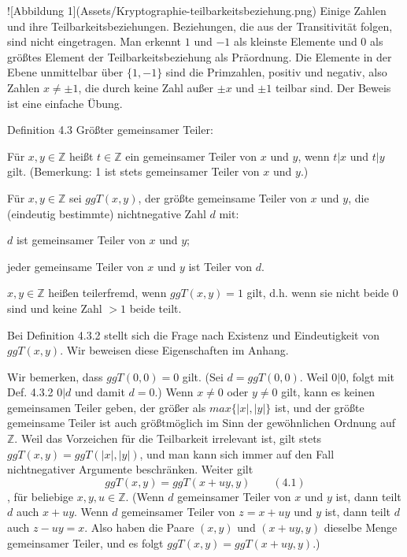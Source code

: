 \documentclass[a4paper]{article}
\begin{document}
\begin{multicols}{3}
    ![Abbildung 1](Assets/Kryptographie-teilbarkeitsbeziehung.png)
    Einige Zahlen und ihre Teilbarkeitsbeziehungen. Beziehungen, die aus der Transitivität folgen, sind nicht eingetragen. Man erkennt $1$ und $-1$ als kleinste Elemente und $0$ als größtes Element der Teilbarkeitsbeziehung als Präordnung. Die Elemente in der Ebene unmittelbar über $\{1,-1\}$ sind die Primzahlen, positiv und negativ, also Zahlen $x\not=\pm 1$, die durch keine Zahl außer $\pm x$ und $\pm 1$ teilbar sind.
    Der Beweis ist eine einfache Übung.

    Definition 4.3 Größter gemeinsamer Teiler:
    \begin{enumerate*}
        \item Für $x,y\in\mathbb{Z}$ heißt $t\in\mathbb{Z}$ ein gemeinsamer Teiler von $x$ und $y$, wenn $t|x$ und $t|y$ gilt. (Bemerkung: 1 ist stets gemeinsamer Teiler von $x$ und $y$.)
        \item Für $x,y\in\mathbb{Z}$ sei $ggT(x, y)$, der größte gemeinsame Teiler von $x$ und $y$, die (eindeutig bestimmte) nichtnegative Zahl $d$ mit:
        \begin{itemize*}
            \item $d$ ist gemeinsamer Teiler von $x$ und $y$;
            \item jeder gemeinsame Teiler von $x$ und $y$ ist Teiler von $d$.
        \end{itemize*}
        \item $x,y\in\mathbb{Z}$ heißen teilerfremd, wenn $ggT(x,y)=1$ gilt, d.h. wenn sie nicht beide $0$ sind und keine Zahl $>1$ beide teilt.
    \end{enumerate*}

    Bei Definition 4.3.2 stellt sich die Frage nach Existenz und Eindeutigkeit von $ggT(x,y)$. Wir beweisen diese Eigenschaften im Anhang.

    Wir bemerken, dass $ggT(0,0) = 0$ gilt. (Sei $d = ggT(0,0)$. Weil $0|0$, folgt mit Def. 4.3.2 $0|d$ und damit $d=0$.) Wenn $x\not= 0$ oder $y\not= 0$ gilt, kann es keinen gemeinsamen Teiler geben, der größer als $max\{|x|,|y|\}$ ist, und der größte gemeinsame Teiler ist auch größtmöglich im Sinn der gewöhnlichen Ordnung auf $\mathbb{Z}$. Weil das Vorzeichen für die Teilbarkeit irrelevant ist, gilt stets $ggT(x,y) = ggT(|x|,|y|)$, und man kann sich immer auf den Fall nichtnegativer Argumente beschränken. Weiter gilt $$ggT(x,y) = ggT(x+uy,y) \quad\quad(4.1)$$, für beliebige $x,y,u\in\mathbb{Z}$. (Wenn $d$ gemeinsamer Teiler von $x$ und $y$ ist, dann teilt $d$ auch $x+uy$. Wenn $d$ gemeinsamer Teiler von $z=x+uy$ und $y$ ist, dann teilt $d$ auch $z-uy =x$. Also haben die Paare $(x,y)$ und $(x+uy,y)$ dieselbe Menge gemeinsamer Teiler, und es folgt $ggT(x,y) = ggT(x+uy,y)$.)


\end{multicols}
\end{document}
